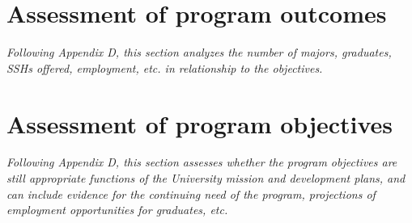 \documentclass[12pt]{article}
\begin{document}
\section{Assessment of program outcomes}

{\em Following Appendix D, this section analyzes the number of majors,
  graduates, SSHs offered, employment, etc. in relationship to the
  objectives.}


\section{Assessment of program objectives}

{\em Following Appendix D, this section assesses whether the program
  objectives are still appropriate functions of the University mission and
  development plans, and can include evidence for the continuing need of
  the program, projections of employment opportunities for graduates, etc.}
\end{document}
